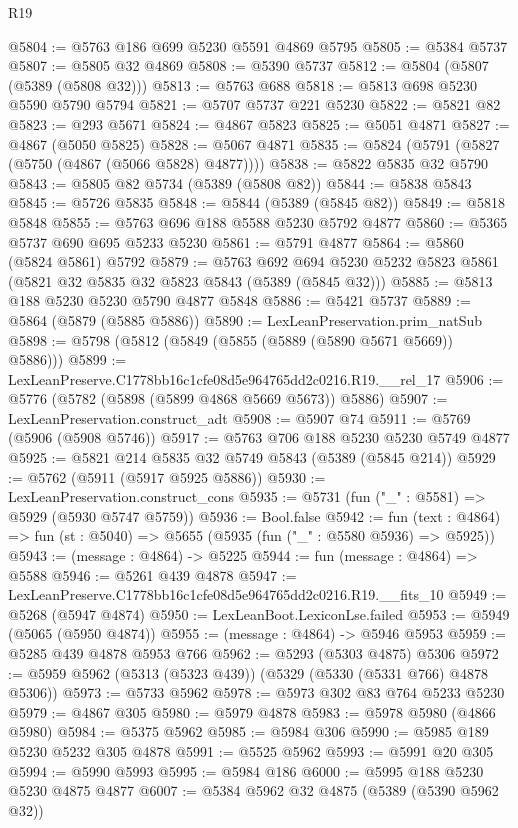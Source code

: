 \begin{lexlean}{R19}
\begin{coremodule}
@5804 := @5763 @186 @699 @5230 @5591 @4869 @5795
@5805 := @5384 @5737
@5807 := @5805 @32 @4869
@5808 := @5390 @5737
@5812 := @5804 (@5807 (@5389 (@5808 @32)))
@5813 := @5763 @688
@5818 := @5813 @698 @5230 @5590 @5790 @5794
@5821 := @5707 @5737 @221 @5230
@5822 := @5821 @82
@5823 := @293 @5671
@5824 := @4867 @5823
@5825 := @5051 @4871
@5827 := @4867 (@5050 @5825)
@5828 := @5067 @4871
@5835 := @5824 (@5791 (@5827 (@5750 (@4867 (@5066 @5828) @4877))))
@5838 := @5822 @5835 @32 @5790
@5843 := @5805 @82 @5734 (@5389 (@5808 @82))
@5844 := @5838 @5843
@5845 := @5726 @5835
@5848 := @5844 (@5389 (@5845 @82))
@5849 := @5818 @5848
@5855 := @5763 @696 @188 @5588 @5230 @5792 @4877
@5860 := @5365 @5737 @690 @695 @5233 @5230
@5861 := @5791 @4877
@5864 := @5860 (@5824 @5861) @5792
@5879 := @5763
    @692
    @694
    @5230
    @5232
    @5823
    @5861
    (@5821 @32 @5835 @32 @5823 @5843 (@5389 (@5845 @32)))
@5885 := @5813 @188 @5230 @5230 @5790 @4877 @5848
@5886 := @5421 @5737
@5889 := @5864 (@5879 (@5885 @5886))
@5890 := LexLeanPreservation.prim_natSub
@5898 := @5798 (@5812 (@5849 (@5855 (@5889 (@5890 @5671 @5669)) @5886)))
@5899 := LexLeanPreserve.C1778bb16c1cfe08d5e964765dd2c0216.R19.__rel_17
@5906 := @5776 (@5782 (@5898 (@5899 @4868 @5669 @5673)) @5886)
@5907 := LexLeanPreservation.construct_adt
@5908 := @5907 @74
@5911 := @5769 (@5906 (@5908 @5746))
@5917 := @5763 @706 @188 @5230 @5230 @5749 @4877
@5925 := @5821 @214 @5835 @32 @5749 @5843 (@5389 (@5845 @214))
@5929 := @5762 (@5911 (@5917 @5925 @5886))
@5930 := LexLeanPreservation.construct_cons
@5935 := @5731 (fun ("_" : @5581) => @5929 (@5930 @5747 @5759))
@5936 := Bool.false
@5942 := fun (text : @4864) => fun (st : @5040) => @5655 (@5935 (fun ("_" : @5580 @5936) => @5925))
@5943 := (message : @4864) -> @5225
@5944 := fun (message : @4864) => @5588
@5946 := @5261 @439 @4878
@5947 := LexLeanPreserve.C1778bb16c1cfe08d5e964765dd2c0216.R19.__fits_10
@5949 := @5268 (@5947 @4874)
@5950 := LexLeanBoot.LexiconLse.failed
@5953 := @5949 (@5065 (@5950 @4874))
@5955 := (message : @4864) -> @5946 @5953
@5959 := @5285 @439 @4878 @5953 @766
@5962 := @5293 (@5303 @4875) @5306
@5972 := @5959 @5962 (@5313 (@5323 @439)) (@5329 (@5330 (@5331 @766) @4878 @5306))
@5973 := @5733 @5962
@5978 := @5973 @302 @83 @764 @5233 @5230
@5979 := @4867 @305
@5980 := @5979 @4878
@5983 := @5978 @5980 (@4866 @5980)
@5984 := @5375 @5962
@5985 := @5984 @306
@5990 := @5985 @189 @5230 @5232 @305 @4878
@5991 := @5525 @5962
@5993 := @5991 @20 @305
@5994 := @5990 @5993
@5995 := @5984 @186
@6000 := @5995 @188 @5230 @5230 @4875 @4877
@6007 := @5384 @5962 @32 @4875 (@5389 (@5390 @5962 @32))

\end{coremodule}
\end{lexlean}

